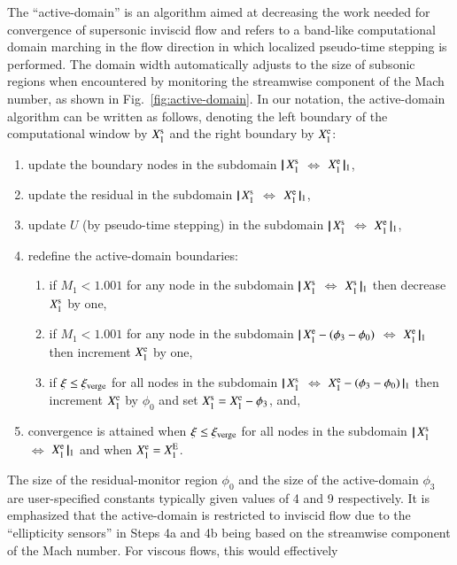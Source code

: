 \documentclass{warpdoc}
\newcommand{\loope}{{\rm e}}
\newcommand{\loops}{{\rm s}}
\newcommand{\loopE}{{\rm E}}
\newcommand{\xiverge}{{\xi_{\rm verge}}}
\newcommand\subdomain[3]{$ | \! | \, #2 $ $\Leftrightarrow$ $#3 \, | \! |_{#1}$}
\begin{document}
The ``active-domain'' is an algorithm aimed at decreasing the work needed for
convergence of supersonic inviscid flow \cite{aiaa:1997:nakahashi} and
refers to a band-like computational domain marching in the flow direction
in which localized pseudo-time stepping is performed. The domain width
automatically adjusts to the size of subsonic regions when encountered by
monitoring the streamwise component of the Mach number, as shown in Fig.~\ref{fig:active-domain}.
In our notation, the active-domain algorithm can be written as follows,
denoting the left boundary of the computational window by $X_1^{\loops}$
and the right boundary by $X_1^{\loope}$:
%
\begin{enumerate}
  \item{update the boundary nodes in the subdomain \subdomain{1}{X^{\loops}_1}{X^{\loope}_1},}
  \item{update the residual in the subdomain \subdomain{1}{X^{\loops}_1}{X^{\loope}_1},}
  \item{update $U$ (by pseudo-time stepping) in the subdomain \subdomain{1}{X^{\loops}_1}{X^{\loope}_1},}
  \item{redefine the active-domain boundaries:}
  \begin{enumerate}
  \item{if $M_1<1.001$ for any node in the
        subdomain \subdomain{1}{X^{\loops}_1}{X^{\loops}_1}
        then decrease $X_1^{\loops}$ by one,}
  \item{if $M_1<1.001$ for any node in the
        subdomain \subdomain{1}{X^{\loope}_1-(\phi_3-\phi_0)}{X^{\loope}_1}
        then increment $X_1^{\loope}$ by one,}
  \item{if $\xi \leq \xiverge$ for all nodes in the subdomain
       \subdomain{1}{X^{\loops}_1}{X^{\loope}_1-(\phi_3-\phi_0)}
       then increment $X^{\loope}_1$ by $\phi_0$ and set $X^{\loops}_1=X^{\loope}_1-\phi_3$,
       and,}
  \end{enumerate}
  \item{convergence is attained when $\xi \leq \xiverge$ for all nodes in the subdomain \subdomain{1}{X^{\loops}_1}{X^{\loope}_1}
        and when $X^{\loope}_1=X^{\loopE}_1$.}
\end{enumerate}
%
The size of the residual-monitor region $\phi_0$ and the size of the active-domain
$\phi_3$ are user-specified constants typically given values of 4 and 9 respectively.
It is emphasized that the active-domain is restricted to inviscid flow
due to the ``ellipticity sensors'' in Steps 4a and 4b being based on the streamwise
component of the Mach number. For viscous flows, this would effectively
\end{document}
